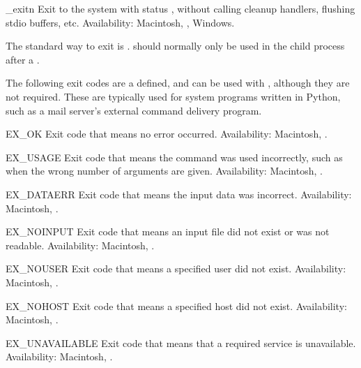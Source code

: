 \begin{funcdesc}{_exit}{n}
Exit to the system with status , without calling cleanup
handlers, flushing stdio buffers, etc.
Availability: Macintosh, \UNIX, Windows.

\begin{notice}
The standard way to exit is .
 should normally only be used in the child process
after a .
\end{notice}
\end{funcdesc}

The following exit codes are a defined, and can be used with
, although they are not required.  These are
typically used for system programs written in Python, such as a
mail server's external command delivery program.

\begin{datadesc}{EX_OK}
Exit code that means no error occurred.
Availability: Macintosh, \UNIX.
\end{datadesc}

\begin{datadesc}{EX_USAGE}
Exit code that means the command was used incorrectly, such as when
the wrong number of arguments are given.
Availability: Macintosh, \UNIX.
\end{datadesc}

\begin{datadesc}{EX_DATAERR}
Exit code that means the input data was incorrect.
Availability: Macintosh, \UNIX.
\end{datadesc}

\begin{datadesc}{EX_NOINPUT}
Exit code that means an input file did not exist or was not readable.
Availability: Macintosh, \UNIX.
\end{datadesc}

\begin{datadesc}{EX_NOUSER}
Exit code that means a specified user did not exist.
Availability: Macintosh, \UNIX.
\end{datadesc}

\begin{datadesc}{EX_NOHOST}
Exit code that means a specified host did not exist.
Availability: Macintosh, \UNIX.
\end{datadesc}

\begin{datadesc}{EX_UNAVAILABLE}
Exit code that means that a required service is unavailable.
Availability: Macintosh, \UNIX.
\end{datadesc}

